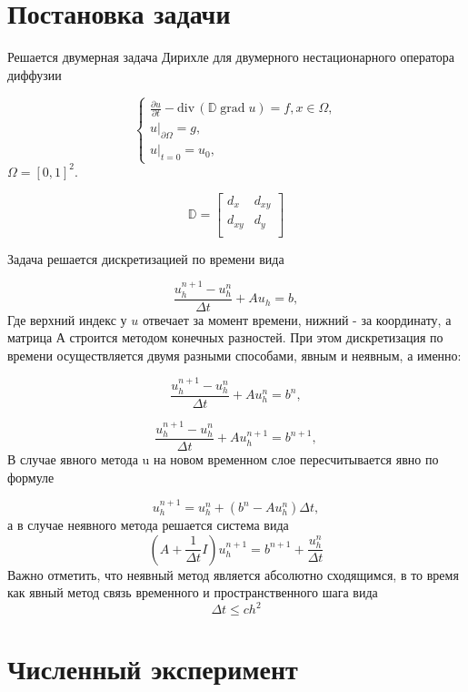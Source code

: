 \documentclass{report}
\DeclareMathOperator{\grad}{grad}
\newcommand{\divg}{\mathrm{div}\,}
\begin{document}
	
\section{Постановка задачи}
Решается двумерная задача Дирихле для двумерного нестационарного оператора диффузии

$$
\begin{cases}
    \frac{\partial u}{\partial t} -\divg(\mathbb{D} \grad u) = f, x \in \Omega, \\
    u|_{\partial \Omega} = g, \\
    u|_{t=0} = u_0,
\end{cases}
$$
$
    \Omega = [0,1]^2.
$


\[
\mathbb{D}=
\begin{bmatrix}
	d_x & d_{xy} \\
	d_{xy} & d_y \\
\end{bmatrix}
\]


Задача решается дискретизацией по времени вида

\[
	\frac{u_h^{n+1} - u_h^n}{\Delta t} + Au_h = b,
\]
Где верхний индекс у $u$ отвечает за момент времени, нижний - за координату, а матрица А строится методом конечных разностей. При этом дискретизация по времени осуществляется двумя разными способами, явным и неявным, а именно:


\begin{equation}
	\frac{u_h^{n+1} - u_h^n}{\Delta t} + Au_h^{n} = b^{n},
\end{equation}

\begin{equation}
	\frac{u_h^{n+1} - u_h^n}{\Delta t} + Au_h^{n+1} = b^{n+1},
\end{equation}
В случае явного метода u на новом временном слое пересчитывается явно по формуле

\begin{equation*}
	u_h^{n+1} = u_h^n + (b^n - Au_h^n)\Delta t,
\end{equation*}
а в случае неявного метода решается система вида
\begin{equation*}
	\left( A + \frac{1}{\Delta t} I\right)u_h^{n+1} = b^{n+1} + \frac{u_h^n}{\Delta t}
\end{equation*}
	Важно отметить, что неявный метод является абсолютно сходящимся, в то время как явный метод связь временного и пространственного шага вида
$$
	\Delta t \leq c h^2
$$	


\section{Численный эксперимент}
\end{document}
